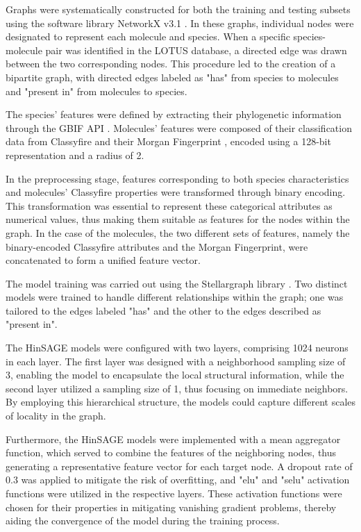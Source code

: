 \documentclass[
11pt, %
oneside, %
english, %
singlespacing, %
headsepline, %
chapterinoneline, %
]{MastersDoctoralThesis} %
\begin{document}
Graphs were systematically constructed for both the training and testing subsets using the software library NetworkX v3.1 \cite{SciPyProceedings_11}. In these graphs, individual nodes were designated to represent each molecule and species. When a specific species-molecule pair was identified in the LOTUS database, a directed edge was drawn between the two corresponding nodes. This procedure led to the creation of a bipartite graph, with directed edges labeled as "has" from species to molecules and "present in" from molecules to species.

The species' features were defined by extracting their phylogenetic information through the GBIF API \cite{GBIF, GbifPygbif2023}. Molecules' features were composed of their classification data from Classyfire \cite{djoumboufeunangClassyFireAutomatedChemical2016} and their Morgan Fingerprint \cite{rogersExtendedConnectivityFingerprints2010}, encoded using a 128-bit representation and a radius of 2.

In the preprocessing stage, features corresponding to both species characteristics and molecules' Classyfire properties were transformed through binary encoding. This transformation was essential to represent these categorical attributes as numerical values, thus making them suitable as features for the nodes within the graph. In the case of the molecules, the two different sets of features, namely the binary-encoded Classyfire attributes and the Morgan Fingerprint, were concatenated to form a unified feature vector.

The model training was carried out using the Stellargraph library \cite{StellarGraphMachineLearning2018}. Two distinct models were trained to handle different relationships within the graph; one was tailored to the edges labeled "has" and the other to the edges described as "present in".

The HinSAGE models were configured with two layers, comprising 1024 neurons in each layer. The first layer was designed with a neighborhood sampling size of 3, enabling the model to encapsulate the local structural information, while the second layer utilized a sampling size of 1, thus focusing on immediate neighbors. By employing this hierarchical structure, the models could capture different scales of locality in the graph.

Furthermore, the HinSAGE models were implemented with a mean aggregator function, which served to combine the features of the neighboring nodes, thus generating a representative feature vector for each target node. A dropout rate of 0.3 was applied to mitigate the risk of overfitting, and "elu" and "selu" activation functions were utilized in the respective layers. These activation functions were chosen for their properties in mitigating vanishing gradient problems, thereby aiding the convergence of the model during the training process. 
\end{document}

